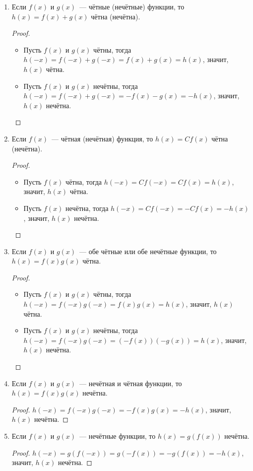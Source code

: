 \begin{enumerate}
	\item Если $f(x)$ и $g(x)$~--- чётные (нечётные) функции, то $h(x) = f(x) + g(x)$ чётна (нечётна).
	\begin{proof}
	\begin{itemize}
		\item Пусть $f(x)$ и $g(x)$ чётны, тогда $h(-x) = f(-x) + g(-x) = f(x) + g(x) = h(x)$, значит, $h(x)$ чётна.
		\item Пусть $f(x)$ и $g(x)$ нечётны, тогда $h(-x) = f(-x) + g(-x) = -f(x) - g(x) = -h(x)$, значит, $h(x)$ нечётна.
	\end{itemize}
	\end{proof}
	
	\item Если $f(x)$~--- чётная (нечётная) функция, то $h(x) = C f(x)$ чётна (нечётна).
	\begin{proof}
	\begin{itemize}
		\item Пусть $f(x)$ чётна, тогда $h(-x) = C f(-x) = C f(x) = h(x)$, значит, $h(x)$ чётна.
		\item Пусть $f(x)$ нечётна, тогда $h(-x) = C f(-x) = -C f(x) = -h(x)$, значит, $h(x)$ нечётна.
	\end{itemize}
	\end{proof}
	
	\item Если $f(x)$ и $g(x)$~--- обе чётные или обе нечётные функции, то $h(x) = f(x)g(x)$ чётна.
	\begin{proof}
	\begin{itemize}
		\item Пусть $f(x)$ и $g(x)$ чётны, тогда $h(-x) = f(-x)g(-x) = f(x)g(x) = h(x)$, значит, $h(x)$ чётна.
		\item Пусть $f(x)$ и $g(x)$ нечётны, тогда $h(-x) = f(-x)g(-x) = (-f(x)) (-g(x)) = h(x)$, значит, $h(x)$ нечётна.
	\end{itemize}
	\end{proof}
	
	\item Если $f(x)$ и $g(x)$~--- нечётная и чётная функции, то $h(x) = f(x)g(x)$ нечётна.
	\begin{proof}
	$h(-x) = f(-x)g(-x) = -f(x)g(x) = -h(x)$, значит, $h(x)$ нечётна.
	\end{proof}
	
	\item Если $f(x)$ и $g(x)$~--- нечётные функции, то $h(x) = g(f(x))$ нечётна.
	\begin{proof}
	$h(-x) = g(f(-x)) = g(-f(x)) = -g(f(x)) = -h(x)$, значит, $h(x)$ нечётна.
	\end{proof}
	

\end{enumerate}
